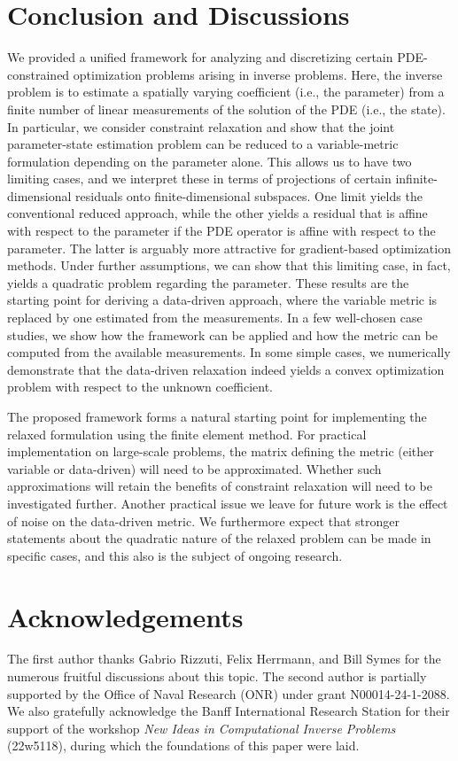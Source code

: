 \documentclass[12pt]{amsart}
\begin{document}
\section{Conclusion and Discussions}\label{conclusions}
We provided a unified framework for analyzing and discretizing certain PDE-constrained optimization problems arising in inverse problems. Here, the inverse problem is to estimate a spatially varying coefficient (i.e., the parameter) from a finite number of linear measurements of the solution of the PDE (i.e., the state). In particular, we consider constraint relaxation and show that the joint parameter-state estimation problem can be reduced to a variable-metric formulation depending on the parameter alone. This allows us to have two limiting cases, and we interpret these in terms of projections of certain infinite-dimensional residuals onto finite-dimensional subspaces. One limit yields the conventional reduced approach, while the other yields a residual that is affine with respect to the parameter if the PDE operator is affine with respect to the parameter. The latter is arguably more attractive for gradient-based optimization methods. Under further assumptions, we can show that this limiting case, in fact, yields a quadratic problem regarding the parameter. These results are the starting point for deriving a data-driven approach, where the variable metric is replaced by one estimated from the measurements. In a few well-chosen case studies, we show how the framework can be applied and how the metric can be computed from the available measurements. In some simple cases, we numerically demonstrate that the data-driven relaxation indeed yields a convex optimization problem with respect to the unknown coefficient.

The proposed framework forms a natural starting point for implementing the relaxed formulation using the finite element method. For practical implementation on large-scale problems, the matrix defining the metric (either variable or data-driven) will need to be approximated. Whether such approximations will retain the benefits of constraint relaxation will need to be investigated further. Another practical issue we leave for future work is the effect of noise on the data-driven metric. We furthermore expect that stronger statements about the quadratic nature of the relaxed problem can be made in specific cases, and this also is the subject of ongoing research.

\section*{Acknowledgements}
The first author thanks Gabrio Rizzuti, Felix Herrmann, and Bill Symes for the numerous fruitful discussions about this topic. The second author is partially supported by the Office of Naval Research (ONR) under grant N00014-24-1-2088.  We also gratefully acknowledge the Banff International Research Station for their support of the workshop \emph{New Ideas in Computational Inverse Problems} (22w5118), during which the foundations of this paper were laid. 
\clearpage
\end{document}
